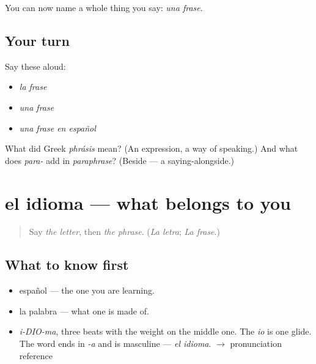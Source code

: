 \begin{grammarlens}[title={What you've built}]
You can now name a whole thing you say: \emph{una frase}.
\end{grammarlens}

\subsection*{Your turn}
Say these aloud:

\begin{itemize}
\raggedright
  \item \emph{la frase}
  \item \emph{una frase}
  \item \emph{una frase en español}
\end{itemize}

\begin{tcolorbox}[breakable,colback=teal!4,colframe=teal!35!black,title={Before you move on}]
What did Greek \emph{phrásis} mean? (An expression, a way of speaking.) And what does \emph{para-} add in \emph{paraphrase}? (Beside — a saying-alongside.)
\end{tcolorbox}
\section[el idioma]{el idioma — what belongs to you}

\label{lesson:ES-C377-idioma}



\begin{quote}
Say \emph{the letter}, then \emph{the phrase}. (\emph{La letra}; \emph{La frase}.)
\end{quote}

\subsection*{What to know first}
\begin{itemize}
\raggedright
  \item español — the one you are learning.
  \item la palabra — what one is made of.
\end{itemize}

\begin{sounds}
\begin{itemize}
\raggedright
  \item \emph{i-DIO-ma}, three beats with the weight on the middle one. The \emph{io} is one glide. The word ends in \emph{-a} and is masculine — \emph{el idioma}. $\to$ pronunciation reference
\end{itemize}
\end{sounds}

